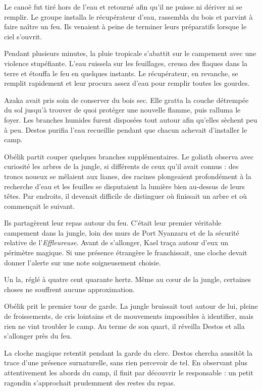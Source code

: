 Le canoë fut tiré hors de l'eau et retourné afin qu'il ne puisse ni dériver ni se remplir. Le groupe installa le récupérateur d'eau, rassembla du bois et parvint à faire naître un feu. Ils venaient à peine de terminer leurs préparatifs lorsque le ciel s'ouvrit.

Pendant plusieurs minutes, la pluie tropicale s'abattit sur le campement avec une violence stupéfiante. L'eau ruissela sur les feuillages, creusa des flaques dans la terre et étouffa le feu en quelques instants. Le récupérateur, en revanche, se remplit rapidement et leur procura assez d'eau pour remplir toutes les gourdes.

Azaka avait pris soin de conserver du bois sec. Elle gratta la couche détrempée du sol jusqu'à trouver de quoi protéger une nouvelle flamme, puis ralluma le foyer. Les branches humides furent disposées tout autour afin qu'elles sèchent peu à peu. Destos purifia l'eau recueillie pendant que chacun achevait d'installer le camp.

Obélik partit couper quelques branches supplémentaires. Le goliath observa avec curiosité les arbres de la jungle, si différents de ceux qu'il avait connus : des troncs noueux se mêlaient aux lianes, des racines plongeaient profondément à la recherche d'eau et les feuilles se disputaient la lumière bien au-dessus de leurs têtes. Par endroits, il devenait difficile de distinguer où finissait un arbre et où commençait le suivant.

Ils partagèrent leur repas autour du feu. C'était leur premier véritable campement dans la jungle, loin des murs de Port Nyanzaru et de la sécurité relative de l'\textit{Effleureuse}. Avant de s'allonger, Kael traça autour d'eux un périmètre magique. Si une présence étrangère le franchissait, une cloche devait donner l'alerte sur une note soigneusement choisie.

\begin{narrateur}
Un la, réglé à quatre cent quarante hertz. Même au cœur de la jungle, certaines choses ne souffrent aucune approximation.
\end{narrateur}

\scenebreak

Obélik prit le premier tour de garde. La jungle bruissait tout autour de lui, pleine de froissements, de cris lointains et de mouvements impossibles à identifier, mais rien ne vint troubler le camp. Au terme de son quart, il réveilla Destos et alla s'allonger près du feu.

La cloche magique retentit pendant la garde du clerc. Destos chercha aussitôt la trace d'une présence surnaturelle, sans rien percevoir de tel. En observant plus attentivement les abords du camp, il finit par découvrir le responsable : un petit ragondin s'approchait prudemment des restes du repas.

